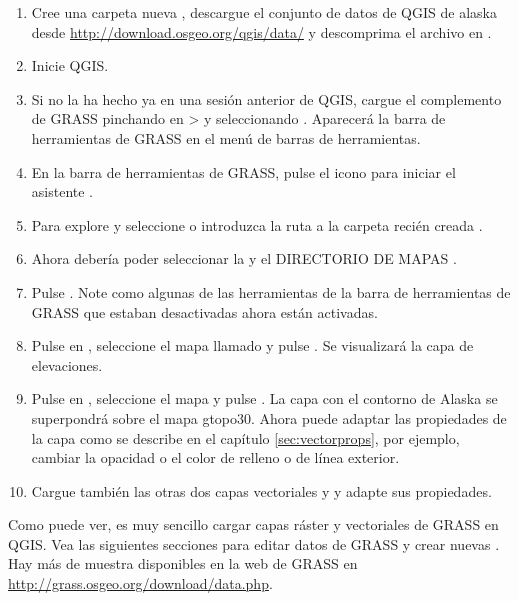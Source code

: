 \begin{enumerate}
  \item Cree una carpeta nueva , descargue el conjunto de datos de QGIS de alaska  desde
  \url{http://download.osgeo.org/qgis/data/} y descomprima el archivo en
  . 
  \item Inicie QGIS.
  \item Si no la ha hecho ya en una sesión anterior de QGIS, cargue el complemento de GRASS pinchando en  >  y
  seleccionando . Aparecerá la barra de herramientas de GRASS en el menú de barras de herramientas.
  \item En la barra de herramientas de GRASS, pulse el icono  para iniciar el asistente  .
  \item Para  explore y seleccione o introduzca la ruta a la carpeta recién creada .
  \item Ahora debería poder seleccionar la 
  y el DIRECTORIO DE MAPAS . 
  \item Pulse . Note como algunas de las herramientas de la barra de herramientas de GRASS que estaban desactivadas ahora están activadas.
  \item Pulse en , seleccione el mapa llamado  y pulse . Se visualizará la capa de elevaciones.
  \item Pulse en ,
  seleccione el mapa  y pulse . La capa con el contorno de Alaska se superpondrá sobre el mapa gtopo30. Ahora puede adaptar las propiedades de la capa como se describe en el capítulo \ref{sec:vectorprops}, por ejemplo, cambiar la opacidad o el color de relleno o de línea exterior.
  \item Cargue también las otras dos capas vectoriales  y
   y adapte sus propiedades.
\end{enumerate}

Como puede ver, es muy sencillo cargar capas ráster y vectoriales de GRASS en QGIS. Vea las siguientes secciones para editar 
datos de GRASS y crear nuevas . Hay más  de 
muestra disponibles en la web de GRASS en \url{http://grass.osgeo.org/download/data.php}.

